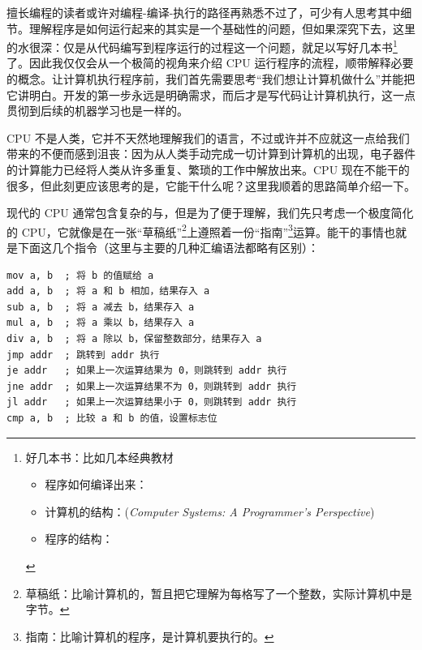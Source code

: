 擅长编程的读者或许对编程-编译-执行的路径再熟悉不过了，可少有人思考其中细节。理解程序是如何运行起来的其实是一个基础性的问题，但如果深究下去，这里的水很深：仅是从代码编写到程序运行的过程这一个问题，就足以写好几本书\footnote{好几本书：比如几本经典教材
    \begin{itemize}
        \item 程序如何编译出来：
        \item 计算机的结构：(\emph{Computer Systems: A Programmer's Perspective})
        \item 程序的结构：
    \end{itemize}
}了。因此我仅仅会从一个极简的视角来介绍 CPU 运行程序的流程，顺带解释必要的概念。让计算机执行程序前，我们首先需要思考“我们想让计算机做什么”并能把它讲明白。开发的第一步永远是明确需求，而后才是写代码让计算机执行，这一点贯彻到后续的机器学习也是一样的。

CPU 不是人类，它并不天然地理解我们的语言，不过或许并不应就这一点给我们带来的不便而感到沮丧：因为从人类手动完成一切计算到计算机的出现，电子器件的计算能力已经将人类从许多重复、繁琐的工作中解放出来。CPU 现在不能干的很多，但此刻更应该思考的是，它能干什么呢？这里我顺着的思路简单介绍一下。

现代的 CPU 通常包含复杂的与，但是为了便于理解，我们先只考虑一个极度简化的 CPU，它就像是在一张“草稿纸”\footnote{草稿纸：比喻计算机的，暂且把它理解为每格写了一个整数，实际计算机中是字节。}上遵照着一份“指南”\footnote{指南：比喻计算机的程序，是计算机要执行的。}运算。能干的事情也就是下面这几个指令（这里与主要的几种汇编语法都略有区别）：
\begin{verbatim}
mov a, b  ; 将 b 的值赋给 a
add a, b  ; 将 a 和 b 相加，结果存入 a
sub a, b  ; 将 a 减去 b，结果存入 a
mul a, b  ; 将 a 乘以 b，结果存入 a
div a, b  ; 将 a 除以 b，保留整数部分，结果存入 a
jmp addr  ; 跳转到 addr 执行
je addr   ; 如果上一次运算结果为 0，则跳转到 addr 执行
jne addr  ; 如果上一次运算结果不为 0，则跳转到 addr 执行
jl addr   ; 如果上一次运算结果小于 0，则跳转到 addr 执行
cmp a, b  ; 比较 a 和 b 的值，设置标志位
\end{verbatim}

